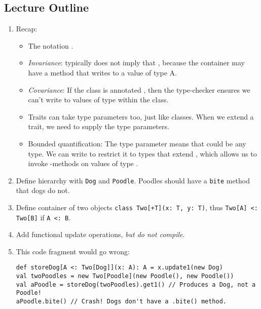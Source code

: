 \documentclass[9pt]{extbook}
\begin{document}
\begin{instructor}

\section*{Lecture Outline}

\begin{enumerate}

  \item Recap:
\begin{itemize}
  
  \item The notation .
  \item \emph{Invariance}: typically  does not imply that , because the container may have a method that writes to a value of type A.
  \item \emph{Covariance}: If the class is annotated , then the type-checker ensures we can't write to values of type  within the class.
  \item Traits can take type parameters too, just like classes. When we extend a trait, we need to supply the type parameters.
  \item Bounded quantification: The type parameter means that  could be any type. We can write  to restrict it to types that extend , which allows us to invoke -methods on values of type .
\end{itemize}

\item Define hierarchy with \lstinline|Dog| and \lstinline|Poodle|. Poodles should have a \lstinline|bite| method
  that dogs do not.

\item Define container of two objects \lstinline|class Two[+T](x: T, y: T)|, thus \lstinline|Two[A] <: Two[B]| if \lstinline|A <: B|.

\item Add functional update operations, \emph{but do not compile}.

\item This code fragment would go wrong:

\begin{lstlisting}
def storeDog[A <: Two[Dog]](x: A): A = x.update1(new Dog)
val twoPoodles = new Two[Poodle](new Poodle(), new Poodle())
val aPoodle = storeDog(twoPoodles).get1() // Produces a Dog, not a Poodle!
aPoodle.bite() // Crash! Dogs don't have a .bite() method.
\end{lstlisting}


\end{enumerate}
\end{instructor}
\end{document}
